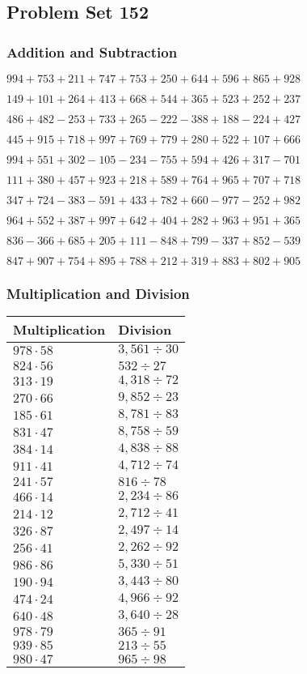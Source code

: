 \hypertarget{problem-set-152}{%
\subsection{Problem Set 152}\label{problem-set-152}}

\hypertarget{addition-and-subtraction}{%
\subsubsection{Addition and
Subtraction}\label{addition-and-subtraction}}

\(994 +753 +211 +747 +753 +250 +644 +596 +865 +928\)

\(149 +101 +264 +413 +668 +544 +365 +523 +252 +237\)

\(486 +482 - 253 +733 +265 - 222 - 388 +188 - 224 +427\)

\(445 +915 +718 +997 +769 +779 +280 +522 +107 +666\)

\(994 +551 +302 - 105 - 234 - 755 +594 +426 +317 - 701\)

\(111 +380 +457 +923 +218 +589 +764 +965 +707 +718\)

\(347 +724 - 383 - 591 +433 +782 +660 - 977 - 252 +982\)

\(964 +552 +387 +997 +642 +404 +282 +963 +951 +365\)

\(836 - 366 +685 +205 +111 - 848 +799 - 337 +852 - 539\)

\(847 +907 +754 +895 +788 +212 +319 +883 +802 +905\)

\hypertarget{multiplication-and-division}{%
\subsubsection{Multiplication and
Division}\label{multiplication-and-division}}

\begin{longtable}[]{@{}ll@{}}
\toprule
Multiplication & Division\tabularnewline
\midrule
\endhead
\(978 \cdot 58\) & \(3,561÷30\)\tabularnewline
\(824 \cdot 56\) & \(532÷27\)\tabularnewline
\(313 \cdot 19\) & \(4,318÷72\)\tabularnewline
\(270 \cdot 66\) & \(9,852÷23\)\tabularnewline
\(185 \cdot 61\) & \(8,781÷83\)\tabularnewline
\(831 \cdot 47\) & \(8,758÷59\)\tabularnewline
\(384 \cdot 14\) & \(4,838÷88\)\tabularnewline
\(911 \cdot 41\) & \(4,712÷74\)\tabularnewline
\(241 \cdot 57\) & \(816÷78\)\tabularnewline
\(466 \cdot 14\) & \(2,234÷86\)\tabularnewline
\(214 \cdot 12\) & \(2,712÷41\)\tabularnewline
\(326 \cdot 87\) & \(2,497÷14\)\tabularnewline
\(256 \cdot 41\) & \(2,262÷92\)\tabularnewline
\(986 \cdot 86\) & \(5,330÷51\)\tabularnewline
\(190 \cdot 94\) & \(3,443÷80\)\tabularnewline
\(474 \cdot 24\) & \(4,966÷92\)\tabularnewline
\(640 \cdot 48\) & \(3,640÷28\)\tabularnewline
\(978 \cdot 79\) & \(365÷91\)\tabularnewline
\(939 \cdot 85\) & \(213÷55\)\tabularnewline
\(980 \cdot 47\) & \(965÷98\)\tabularnewline
\bottomrule
\end{longtable}
